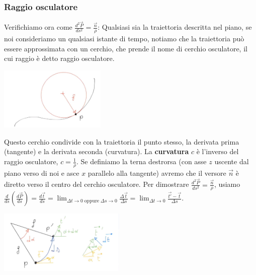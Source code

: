\subsubsection*{Raggio osculatore}
Verifichiamo ora come $\frac{d^2 \vec{P}}{ds^2} = \frac{\vec{n}}{\rho}$:\newline
Qualsiasi sia la traiettoria descritta nel piano, se noi consideriamo un qualsiasi istante di tempo, notiamo che la traiettoria può essere approssimata con un cerchio, che prende il nome di cerchio osculatore, il cui raggio è detto raggio osculatore.
\begin{center}
    \includegraphics[height=3cm]{../lezione1/img3.JPG}
\end{center}
Questo cerchio condivide con la traiettoria il punto stesso, la derivata prima (tangente) e la derivata seconda (curvatura). \newline
\newline
La \textbf{curvatura} $c$ è l'inverso del raggio osculatore, $c = \frac{1}{\rho}$. Se definiamo la terna destrorsa (con asse $z$ uscente dal piano verso di noi e asce $x$ parallelo alla tangente) avremo che il versore $\vec{n}$ è diretto verso il centro del cerchio osculatore.\newline
\newline
Per dimostrare $\frac{d^2 \vec{P}}{ds^2} = \frac{\vec{n}}{\rho}$, usiamo $\frac{d}{ds} \left(\frac{d \vec{P}}{ds}\right) = \frac{d \vec{t}}{ds} = \lim_{\Delta t\rightarrow 0 \;\text{oppure}\;\Delta s \rightarrow 0} \frac{\Delta \vec{t}}{\Delta s} = \lim_{\Delta t\rightarrow 0} \frac{\vec{t'}- \vec{t}}{\Delta s}$.\newline
{}\newline
\begin{center}
    \includegraphics[height=3cm]{../lezione1/img4.JPG}
\end{center}
